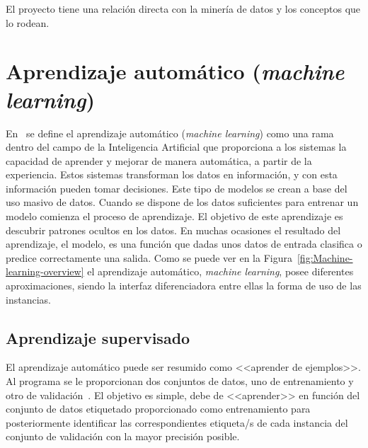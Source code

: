 
El proyecto tiene una relación directa con la minería de datos y los conceptos que lo rodean. 

\section{Aprendizaje automático (\textit{machine learning})}\label{sec:machine-learning}
En~\cite{sanchez_2020} se define el aprendizaje automático (\textit{machine learning}) como una rama dentro del campo de la Inteligencia Artificial que proporciona a los sistemas la capacidad de aprender y mejorar de manera automática, a partir de la experiencia. Estos sistemas transforman los datos en información, y con esta información pueden tomar decisiones. Este tipo de modelos se crean a base del uso masivo de datos. Cuando se dispone de los datos suficientes para entrenar un modelo comienza el proceso de aprendizaje. El objetivo de este aprendizaje es descubrir patrones ocultos en los datos. En muchas ocasiones el resultado del aprendizaje, el modelo, es una función que dadas unos datos de entrada clasifica o predice correctamente una salida. Como se puede ver en la Figura~\ref{fig:Machine-learning-overview} el aprendizaje automático, \textit{machine learning}, posee diferentes aproximaciones, siendo la interfaz diferenciadora entre ellas la forma de uso de las instancias.

\subsection{Aprendizaje supervisado}\label{subsec:Aprendizaje-Supervisado}
El aprendizaje automático puede ser resumido como <<aprender de ejemplos>>. Al programa se le proporcionan dos conjuntos de datos, uno de entrenamiento y otro de validación~\cite{learned2014introduction}. El objetivo es simple, debe de <<aprender>> en función del conjunto de datos etiquetado proporcionado como entrenamiento para posteriormente identificar las correspondientes etiqueta/s de cada instancia del conjunto de validación con la mayor precisión posible. 

